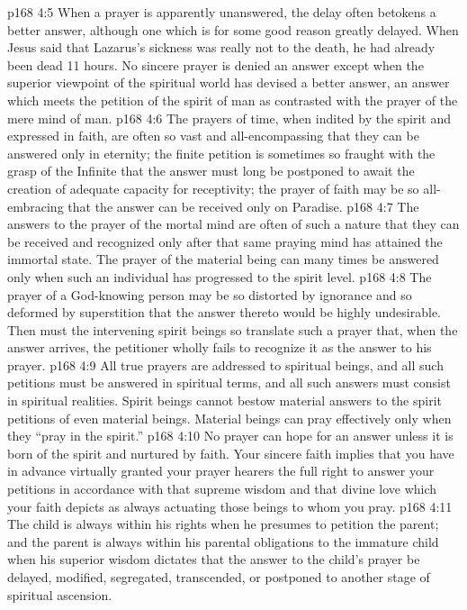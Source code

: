\vs p168 4:5 \bibnobreakspace When a prayer is apparently unanswered, the delay often betokens a better answer, although one which is for some good reason greatly delayed. When Jesus said that Lazarus’s sickness was really not to the death, he had already been dead 11 hours. No sincere prayer is denied an answer except when the superior viewpoint of the spiritual world has devised a better answer, an answer which meets the petition of the spirit of man as contrasted with the prayer of the mere mind of man.
\vs p168 4:6 \bibnobreakspace The prayers of time, when indited by the spirit and expressed in faith, are often so vast and all\hyp{}encompassing that they can be answered only in eternity; the finite petition is sometimes so fraught with the grasp of the Infinite that the answer must long be postponed to await the creation of adequate capacity for receptivity; the prayer of faith may be so all\hyp{}embracing that the answer can be received only on Paradise.
\vs p168 4:7 \bibnobreakspace The answers to the prayer of the mortal mind are often of such a nature that they can be received and recognized only after that same praying mind has attained the immortal state. The prayer of the material being can many times be answered only when such an individual has progressed to the spirit level.
\vs p168 4:8 \bibnobreakspace The prayer of a God\hyp{}knowing person may be so distorted by ignorance and so deformed by superstition that the answer thereto would be highly undesirable. Then must the intervening spirit beings so translate such a prayer that, when the answer arrives, the petitioner wholly fails to recognize it as the answer to his prayer.
\vs p168 4:9 \bibnobreakspace All true prayers are addressed to spiritual beings, and all such petitions must be answered in spiritual terms, and all such answers must consist in spiritual realities. Spirit beings cannot bestow material answers to the spirit petitions of even material beings. Material beings can pray effectively only when they “pray in the spirit.”
\vs p168 4:10 \bibnobreakspace No prayer can hope for an answer unless it is born of the spirit and nurtured by faith. Your sincere faith implies that you have in advance virtually granted your prayer hearers the full right to answer your petitions in accordance with that supreme wisdom and that divine love which your faith depicts as always actuating those beings to whom you pray.
\vs p168 4:11 \bibnobreakspace The child is always within his rights when he presumes to petition the parent; and the parent is always within his parental obligations to the immature child when his superior wisdom dictates that the answer to the child’s prayer be delayed, modified, segregated, transcended, or postponed to another stage of spiritual ascension.
